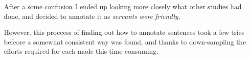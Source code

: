 \documentclass[a4paper,11pt]{kth-mag}
\begin{document}
After a some confusion I ended up looking more closely what other studies had done, and decided to annotate it as \emph{servants were friendly}.

However, this proccess of finding out how to annotate sentences took a few tries befeore a somewhat consistent way was found, and thanks to down-sampling the efforts required for each made this time consuming.





\end{document}
